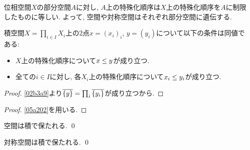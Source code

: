 \documentclass[uplatex, dvipdfmx, a4paper, 12pt, class=jsbook, crop=false]{standalone}
\begin{document}
位相空間$X$の部分空間$A$に対し, $A$上の特殊化順序は$X$上の特殊化順序を$A$に制限したものに等しい.
よって, 空間や対称空間はそれぞれ部分空間に遺伝する.

\begin{proposition}
	\label{a1a202}
	積空間$X = \prod_{i \in I} X_i$上の2点$x = (x_i)_i$, $y = (y_i)$について以下の条件は同値である:
	\begin{itemize}
		\item $X$上の特殊化順序について$x \leq y$が成り立つ.
		\item 全ての$i \in I$に対し, 各$X_i$上の特殊化順序について$x_i \leq y_i$が成り立つ.
	\end{itemize}
\end{proposition}

\begin{proof}
	\cref{02b3a9}より$\overline{\{y\}} = \prod_i \overline{\{y_i\}}$が成り立つから.
\end{proof}

\begin{proof}
	\cref{05a202}を用いる.
\end{proof}

\begin{corollary}
	空間は積で保たれる.
	\qed
\end{corollary}

\begin{corollary}
	対称空間は積で保たれる.
	\qed
\end{corollary}
\end{document}
